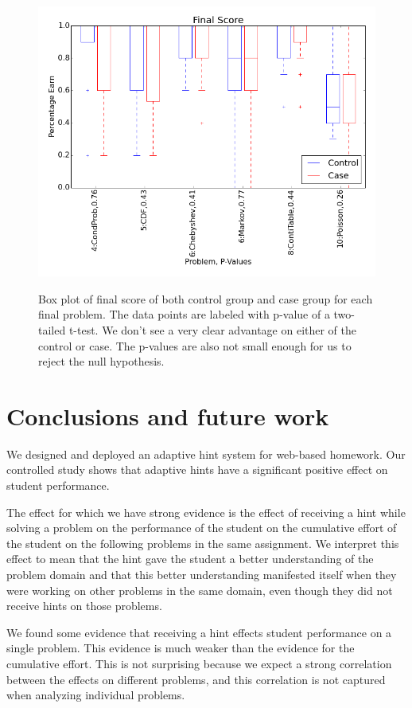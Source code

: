 \documentclass{llncs2e/llncs}
\begin{document}
\begin{figure}
\centering
\caption{Box plot of final score of both control group and case group for each final problem. The data points are labeled with p-value of a two-tailed t-test. We don't see a very clear advantage on either of the control or case. The p-values are also not small enough for us to reject the null hypothesis.}
\includegraphics[width=0.9\linewidth]{image/final_boxPlot.png}
\label{fig:final_compare_all}
\end{figure}
\fi


\section{Conclusions and future work}

We designed and deployed an adaptive hint system for web-based homework. Our controlled study shows that adaptive hints have a significant positive effect on student performance.

The effect for which we have strong evidence is the effect of receiving a hint while solving a problem on the performance of the student on the cumulative effort of the student on the following problems in the same assignment. We interpret this effect to mean that the hint gave the student a better understanding of the problem domain and that this better understanding manifested itself when they were working on other problems in the same domain, even though they did not receive hints on those problems.

We found some evidence that receiving a hint effects student performance on a single problem. This evidence is much weaker than the evidence for the cumulative effort. This is not surprising because we expect a strong correlation between the effects on different problems, and this correlation is not captured when analyzing individual problems.
\end{document}
